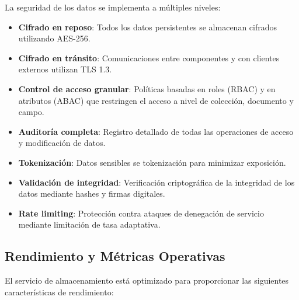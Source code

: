 \documentclass[12pt,a4paper]{article}
\begin{document}
La seguridad de los datos se implementa a múltiples niveles:

\begin{itemize}
    \item \textbf{Cifrado en reposo}: Todos los datos persistentes se almacenan cifrados utilizando AES-256.
    
    \item \textbf{Cifrado en tránsito}: Comunicaciones entre componentes y con clientes externos utilizan TLS 1.3.
    
    \item \textbf{Control de acceso granular}: Políticas basadas en roles (RBAC) y en atributos (ABAC) que restringen el acceso a nivel de colección, documento y campo.
    
    \item \textbf{Auditoría completa}: Registro detallado de todas las operaciones de acceso y modificación de datos.
    
    \item \textbf{Tokenización}: Datos sensibles se tokenización para minimizar exposición.
    
    \item \textbf{Validación de integridad}: Verificación criptográfica de la integridad de los datos mediante hashes y firmas digitales.
    
    \item \textbf{Rate limiting}: Protección contra ataques de denegación de servicio mediante limitación de tasa adaptativa.
\end{itemize}

\subsection{Rendimiento y Métricas Operativas}
\label{subsec:ds-rendimiento}

El servicio de almacenamiento está optimizado para proporcionar las siguientes características de rendimiento:
\end{document}

